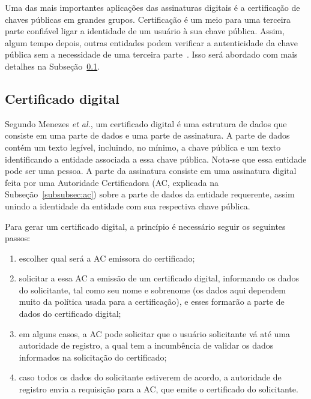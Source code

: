 \documentclass{article}
\begin{document}
Uma das mais importantes aplicações das assinaturas digitais é a certificação
de chaves públicas em grandes grupos. Certificação é um meio para uma terceira
parte confiável ligar a identidade de um usuário à sua chave pública. Assim,
algum tempo depois, outras entidades podem verificar a autenticidade da chave
pública sem a necessidade de uma terceira parte~\cite{Menezes:book:1996}. Isso
será abordado com mais detalhes na Subseção~\ref{subsec:digitalcert}.

\subsection{Certificado digital}\label{subsec:digitalcert}

Segundo Menezes \textit{et al.}, um certificado digital é uma estrutura de
dados que consiste em uma parte de dados e uma parte de assinatura. A parte de
dados contém um texto legível, incluindo, no mínimo, a chave pública e um texto
identificando a entidade associada a essa chave pública. Nota-se que essa
entidade pode ser uma pessoa. A parte da assinatura consiste em uma assinatura
digital feita por uma Autoridade Certificadora (AC, explicada na
Subseção~\ref{subsubsec:ac}) sobre a parte de dados da entidade requerente,
assim unindo a identidade da entidade com sua respectiva chave pública.

Para gerar um certificado digital, a princípio é necessário seguir os seguintes
passos:

\begin{enumerate}
  \item escolher qual será a AC emissora do certificado;

  \item solicitar a essa AC a emissão de um certificado digital, informando os
      dados do solicitante, tal como seu nome e sobrenome (os dados aqui
        dependem muito da política usada para a certificação), e esses formarão
        a parte de dados do certificado digital;

  \item em alguns casos, a AC pode solicitar que o usuário solicitante vá até
      uma autoridade de registro, a qual tem a incumbência de validar os dados
        informados na solicitação do certificado;

  \item caso todos os dados do solicitante estiverem de acordo, a autoridade de
      registro envia a requisição para a AC, que emite o certificado do
        solicitante.
\end{enumerate}
\end{document}
